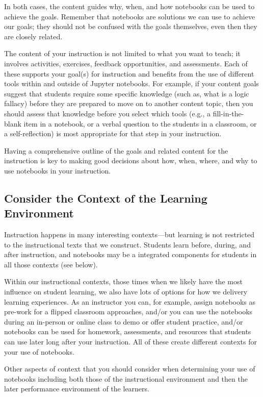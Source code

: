 \documentclass[]{book}
\begin{document}
In both cases, the content guides why, when, and how notebooks can be
used to achieve the goals. Remember that notebooks are solutions we can
use to achieve our goals; they should not be confused with the goals
themselves, even then they are closely related.

The content of your instruction is not limited to what you want to
teach; it involves activities, exercises, feedback opportunities, and
assessments. Each of these supports your goal(s) for instruction and
benefits from the use of different tools within and outside of Jupyter
notebooks. For example, if your content goals suggest that students
require some specific knowledge (such as, what is a logic fallacy)
before they are prepared to move on to another content topic, then you
should assess that knowledge before you select which tools (e.g., a
fill-in-the-blank item in a notebook, or a verbal question to the
students in a classroom, or a self-reflection) is most appropriate for
that step in your instruction.

Having a comprehensive outline of the goals and related content for the
instruction is key to making good decisions about how, when, where, and
why to use notebooks in your instruction.

\subsection{Consider the Context of the Learning
Environment}\label{consider-the-context-of-the-learning-environment}

Instruction happens in many interesting contexts---but learning is not
restricted to the instructional texts that we construct. Students learn
before, during, and after instruction, and notebooks may be a integrated
components for students in all those contexts (see below).

Within our instructional contexts, those times when we likely have the
most influence on student learning, we also have lots of options for how
we delivery learning experiences. As an instructor you can, for example,
assign notebooks as pre-work for a flipped classroom approaches, and/or
you can use the notebooks during an in-person or online class to demo or
offer student practice, and/or notebooks can be used for homework,
assessments, and resources that students can use later long after your
instruction. All of these create different contexts for your use of
notebooks.

Other aspects of context that you should consider when determining your
use of notebooks including both those of the instructional environment
and then the later performance environment of the learners.
\end{document}
